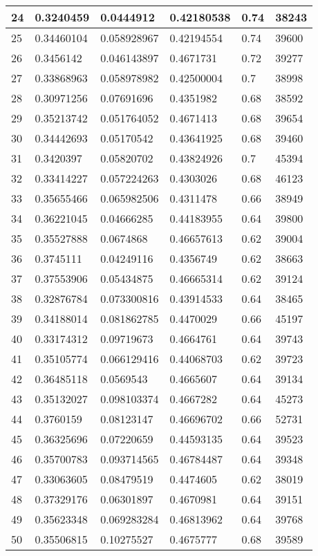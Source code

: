 \begin{longtable}{|l|l|l|l|l|l|}
24 & 0.3240459 & 0.0444912 & 0.42180538 & 0.74 & 38243 \\ \hline 
25 & 0.34460104 & 0.058928967 & 0.42194554 & 0.74 & 39600 \\ \hline 
26 & 0.3456142 & 0.046143897 & 0.4671731 & 0.72 & 39277 \\ \hline 
27 & 0.33868963 & 0.058978982 & 0.42500004 & 0.7 & 38998 \\ \hline 
28 & 0.30971256 & 0.07691696 & 0.4351982 & 0.68 & 38592 \\ \hline 
29 & 0.35213742 & 0.051764052 & 0.4671413 & 0.68 & 39654 \\ \hline 
30 & 0.34442693 & 0.05170542 & 0.43641925 & 0.68 & 39460 \\ \hline 
31 & 0.3420397 & 0.05820702 & 0.43824926 & 0.7 & 45394 \\ \hline 
32 & 0.33414227 & 0.057224263 & 0.4303026 & 0.68 & 46123 \\ \hline 
33 & 0.35655466 & 0.065982506 & 0.4311478 & 0.66 & 38949 \\ \hline 
34 & 0.36221045 & 0.04666285 & 0.44183955 & 0.64 & 39800 \\ \hline 
35 & 0.35527888 & 0.0674868 & 0.46657613 & 0.62 & 39004 \\ \hline 
36 & 0.3745111 & 0.04249116 & 0.4356749 & 0.62 & 38663 \\ \hline 
37 & 0.37553906 & 0.05434875 & 0.46665314 & 0.62 & 39124 \\ \hline 
38 & 0.32876784 & 0.073300816 & 0.43914533 & 0.64 & 38465 \\ \hline 
39 & 0.34188014 & 0.081862785 & 0.4470029 & 0.66 & 45197 \\ \hline 
40 & 0.33174312 & 0.09719673 & 0.4664761 & 0.64 & 39743 \\ \hline 
41 & 0.35105774 & 0.066129416 & 0.44068703 & 0.62 & 39723 \\ \hline 
42 & 0.36485118 & 0.0569543 & 0.4665607 & 0.64 & 39134 \\ \hline 
43 & 0.35132027 & 0.098103374 & 0.4667282 & 0.64 & 45273 \\ \hline 
44 & 0.3760159 & 0.08123147 & 0.46696702 & 0.66 & 52731 \\ \hline 
45 & 0.36325696 & 0.07220659 & 0.44593135 & 0.64 & 39523 \\ \hline 
46 & 0.35700783 & 0.093714565 & 0.46784487 & 0.64 & 39348 \\ \hline 
47 & 0.33063605 & 0.08479519 & 0.4474605 & 0.62 & 38019 \\ \hline 
48 & 0.37329176 & 0.06301897 & 0.4670981 & 0.64 & 39151 \\ \hline 
49 & 0.35623348 & 0.069283284 & 0.46813962 & 0.64 & 39768 \\ \hline 
50 & 0.35506815 & 0.10275527 & 0.4675777 & 0.68 & 39589 \\ \hline 
\end{longtable}